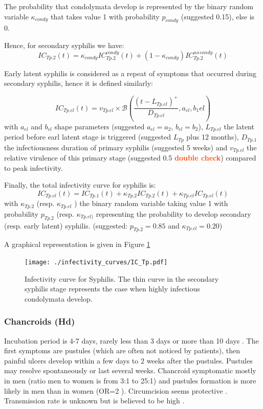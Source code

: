 \documentclass[11pt, onecolumn]{article}
\newcommand{\warning}[1]{\textbf{\textcolor{OrangeRed}{#1}}}
\begin{document}
The probability that condolymata develop is represented by the binary random variable $\kappa_{condy}$ that takes value 1 with probability $p_{condy}$ (suggested 0.15), else is 0.

Hence, for secondary syphilis we have:
$$IC_{Tp.2}(t)  = \kappa_{condy}IC_{Tp.2}^{condy}(t) +(1-\kappa_{condy})IC_{Tp.2}^{no\,condy}(t) $$

Early latent syphilis is considered as a repeat of symptoms that occurred during secondary syphilis, hence it is defined similarly:

$$IC_{Tp.el}(t) = v_{Tp.el}\times\mathcal{B} \left(\frac{(t-L_{Tp.el})^
+}{D_{Tp.el}}, a_{el},b_1{el} \right) $$
with $a_{el}$ and $b_{el}$ shape parameters (suggested $a_{el}=a_2$, $b_{el} = b_2$), $L_{Tp.el}$ the latent period before earl latent stage is triggered (suggested $L_{Tp}$ plus 12 months), $D_{Tp.1}$ the infectiousness duration of primary syphilis (suggested 5 weeks) and $v_{Tp.el}$ the relative virulence of this primary stage (suggested 0.5 \warning{double check}) compared to peak infectivity.

Finally, the total infectivity curve for syphilis is:
$$IC_{Tp.el}(t) = IC_{Tp.1}(t) +\kappa_{Tp.2}IC_{Tp.2}(t) +\kappa_{Tp.el}IC_{Tp.el}(t) $$
with $\kappa_{Tp.2}$ (resp. $\kappa_{Tp.el}$ ) the binary random variable taking value 1 with probability $p_{Tp.2}$ (resp. $\kappa_{Tp.el)}$ representing the probability to develop secondary (resp. early latent) syphilis. (suggested: $p_{Tp.2}=0.85$ and $\kappa_{Tp.el}=0.20$)

A graphical representation is given in Figure \ref{fig:ICTp}

\begin{figure}[!ht]
\centering
    \texttt{[image: ./infectivity\_curves/IC\_Tp.pdf]}
\caption{Infectivity curve for Syphilis. The thin curve in the secondary syphilis stage represents the case when highly infectious condolymata develop.}
\label{fig:ICTp}
\end{figure} 

\subsubsection{Chancroids (Hd)}

 Incubation period is 4-7 days, rarely less than 3 days or more than 10 days \cite{Sakuma:2011gx,Morse:1989io}. The first symptoms are pustules (which are often not noticed by patients), then painful ulcers develop within a few days to 2 weeks \cite{Sakuma:2011gx} after the pustules. Pustules may resolve spontaneously or last several weeks\cite{Spinola:2002kn}. Chancroid symptomatic mostly in men (ratio men to women is from 3:1 to 25:1) \cite{Sakuma:2011gx} and pustules formation is more likely in men than in women (OR=2 \cite{Spinola:2002kn}).
Circumcision seems protective \cite{Hammond:1980uz}. Transmission rate is unknown but is believed to be high \cite{Spinola:2002kn}. 
\end{document}
